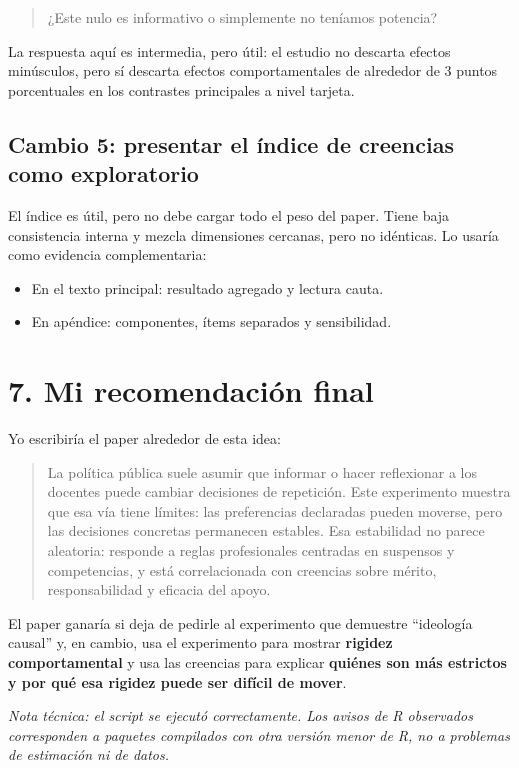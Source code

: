 \documentclass[12pt,a4paper]{article}
\newcommand{\pp}{puntos porcentuales}
\begin{document}
\begin{quote}
¿Este nulo es informativo o simplemente no teníamos potencia?
\end{quote}

La respuesta aquí es intermedia, pero útil: el estudio no descarta efectos minúsculos, pero sí descarta efectos comportamentales de alrededor de 3 \pp{} en los contrastes principales a nivel tarjeta.

\subsection*{Cambio 5: presentar el índice de creencias como exploratorio}

El índice es útil, pero no debe cargar todo el peso del paper. Tiene baja consistencia interna y mezcla dimensiones cercanas, pero no idénticas. Lo usaría como evidencia complementaria:

\begin{itemize}
  \item En el texto principal: resultado agregado y lectura cauta.
  \item En apéndice: componentes, ítems separados y sensibilidad.
\end{itemize}

\section*{7. Mi recomendación final}

Yo escribiría el paper alrededor de esta idea:

\begin{quote}
La política pública suele asumir que informar o hacer reflexionar a los docentes puede cambiar decisiones de repetición. Este experimento muestra que esa vía tiene límites: las preferencias declaradas pueden moverse, pero las decisiones concretas permanecen estables. Esa estabilidad no parece aleatoria: responde a reglas profesionales centradas en suspensos y competencias, y está correlacionada con creencias sobre mérito, responsabilidad y eficacia del apoyo.
\end{quote}

El paper ganaría si deja de pedirle al experimento que demuestre ``ideología causal'' y, en cambio, usa el experimento para mostrar \textbf{rigidez comportamental} y usa las creencias para explicar \textbf{quiénes son más estrictos y por qué esa rigidez puede ser difícil de mover}.

\vfill
{\small \textit{Nota técnica: el script se ejecutó correctamente. Los avisos de R observados corresponden a paquetes compilados con otra versión menor de R, no a problemas de estimación ni de datos.}}
\end{document}

